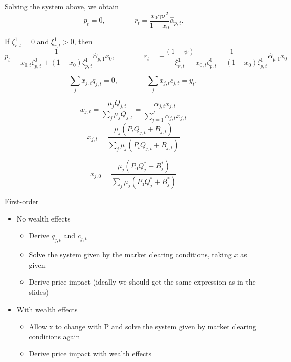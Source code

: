 \documentclass[11pt,english]{article}
\begin{document}
Solving the system above, we obtain
\begin{equation}
    p_t = 0, \qquad \qquad r_t = \frac{x_0 \gamma \sigma^2}{1-x_0} \hat{\alpha}_{p,t}.
\end{equation}

If $\zeta_{r,t}^1 = 0$ and $\xi_{r,t}^1 > 0$, then 
\begin{equation}
    p_t = \frac{1}{x_{0,t} \zeta_{p,t}^0 + (1-x_0) \zeta_{p,t}^1} \hat{\alpha}_{p,1} x_0, \qquad \qquad r_t = - \frac{(1-\psi)}{\xi_{r,t}^1} \frac{1}{x_{0,t} \zeta_{p,t}^0 + (1-x_0) \zeta_{p,t}^1} \hat{\alpha}_{p,1} x_0
\end{equation}

\begin{equation}
    \sum_{j} x_{j,t} q_{j,t} = 0, \qquad \qquad 
    \sum_{j} x_{j,t} c_{j,t} = y_t, 
\end{equation}

\begin{equation}
    w_{j,t} = \frac{\mu_j Q_{j,t}}{\sum_j \mu_j Q_{j,t}} = \frac{ \alpha_{j,t} x_{j,t}}{\sum_{j=1}^J \alpha_{j,t} x_{j,t}}
\end{equation}
\begin{equation}
    x_{j,t} = \frac{\mu_j (P_t Q_{j,t} + B_{j,t})}{\sum_j \mu_j  (P_t Q_{j,t} + B_{j,t})}
\end{equation}

\begin{equation}
    x_{j,0} = \frac{\mu_j (P_0 Q_{j}^* + B_{j}^*)}{\sum_j \mu_j  (P_0 Q_{j}^* + B_{j}^*)}
\end{equation}



First-order
\begin{itemize}
    \item No wealth effects
    \begin{itemize}
    \item Derive $q_{j,t}$ and $c_{j,t}$
    \item Solve the system given by the market clearing conditions, taking $x$ as given
    \item Derive price impact (ideally we should get the same expression as in the slides)
\end{itemize}
\item With wealth effects
\begin{itemize}
    \item Allow x to change with P and solve the system given by market clearing conditions again
    \item Derive price impact with wealth effects
\end{itemize}
\end{itemize}
\end{document}
